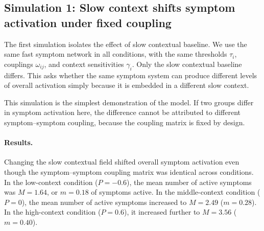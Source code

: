 %
%


\subsection{Simulation 1: Slow context shifts symptom activation under fixed coupling}

The first simulation isolates the effect of slow contextual baseline. We use
the same fast symptom network in all conditions, with the same thresholds
\(\tau_i\), couplings \(\omega_{ij}\), and context sensitivities \(\gamma_i\).
Only the slow contextual baseline differs. This asks whether the same symptom
system can produce different levels of overall activation simply because it is
embedded in a different slow context.

This simulation is the simplest demonstration of the model. If two groups
differ in symptom activation here, the difference cannot be attributed to
different symptom--symptom coupling, because the coupling matrix is fixed by
design.

\paragraph{Results.}
Changing the slow contextual field shifted overall symptom activation even
though the symptom--symptom coupling matrix was identical across conditions. In
the low-context condition (\(P=-0.6\)), the mean number of active symptoms was
\(M=1.64\), or \(m=0.18\) of symptoms active. In the middle-context condition
(\(P=0\)), the mean number of active symptoms increased to \(M=2.49\)
(\(m=0.28\)). In the high-context condition (\(P=0.6\)), it increased further
to \(M=3.56\) (\(m=0.40\)).

